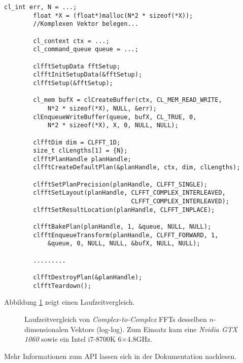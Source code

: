 		\begin{lstlisting}[caption=clFFT Beispiel]
		cl_int err, N = ...;
		float *X = (float*)malloc(N*2 * sizeof(*X));
		//Komplexen Vektor belegen...
		
		cl_context ctx = ...;
		cl_command_queue queue = ...;
		
		clfftSetupData fftSetup;
		clfftInitSetupData(&fftSetup);
		clfftSetup(&fftSetup);

		cl_mem bufX = clCreateBuffer(ctx, CL_MEM_READ_WRITE, 
			N*2 * sizeof(*X), NULL, &err);
		clEnqueueWriteBuffer(queue, bufX, CL_TRUE, 0, 
			N*2 * sizeof(*X), X, 0, NULL, NULL);
		
		clfftDim dim = CLFFT_1D;
		size_t clLengths[1] = {N};
		clfftPlanHandle planHandle;
		clfftCreateDefaultPlan(&planHandle, ctx, dim, clLengths);

		clfftSetPlanPrecision(planHandle, CLFFT_SINGLE);
		clfftSetLayout(planHandle, CLFFT_COMPLEX_INTERLEAVED, 
			                       CLFFT_COMPLEX_INTERLEAVED);
		clfftSetResultLocation(planHandle, CLFFT_INPLACE);

		clfftBakePlan(planHandle, 1, &queue, NULL, NULL);
		clfftEnqueueTransform(planHandle, CLFFT_FORWARD, 1, 
			&queue, 0, NULL, NULL, &bufX, NULL, NULL);
		
		.........
		
		clfftDestroyPlan(&planHandle);
		clfftTeardown();
		\end{lstlisting}		
		
		Abbildung \ref{fig6:fft} zeigt einen Laufzeitvergleich.	
					
		\begin{figure}[h]
  			\centering
  			\caption[Vergleich von FFTs]{Laufzeitvergleich von \textit{Complex-to-Complex} FFTs desselben $n$-dimensionalen Vektors (log-log). Zum Einsatz kam eine \textit{Nvidia GTX 1060} sowie ein Intel i7-8700K 6$\times$4.8GHz.}
  			\label{fig6:fft}
		\end{figure}
		
		Mehr Informationen zum \Gls{API} lassen sich in der Dokumentation nachlesen. \autocite{clfftDoc}